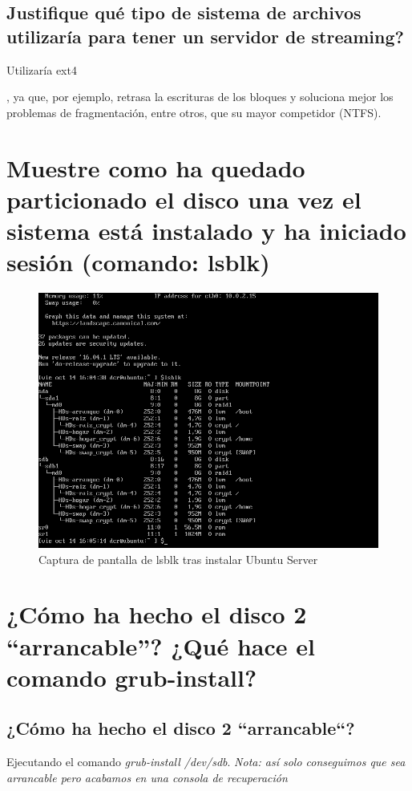 \subsection{Justifique qué tipo de sistema de archivos utilizaría para tener un servidor de streaming?}
Utilizaría ext4 {\cite{c9b}, ya que, por ejemplo, retrasa la escrituras de los bloques y soluciona mejor los problemas de fragmentación, entre otros, que su mayor competidor (NTFS).
\section{Muestre como ha quedado particionado el disco una vez el sistema está instalado y ha iniciado sesión (comando: lsblk)}

\begin{figure}[H]
	\centering
		\includegraphics[width=1\textwidth]{lsblk.png}
		\caption{Captura de pantalla de lsblk tras instalar Ubuntu Server}
\end{figure}
\section{¿Cómo ha hecho el disco 2 ``arrancable''? ¿Qué hace el comando grub-install?}
\subsection{¿Cómo ha hecho el disco 2 ``arrancable``?}
Ejecutando el comando \textit{grub-install /dev/sdb}. \textit{Nota: así solo conseguimos que sea arrancable pero acabamos en una consola de recuperación}

}
